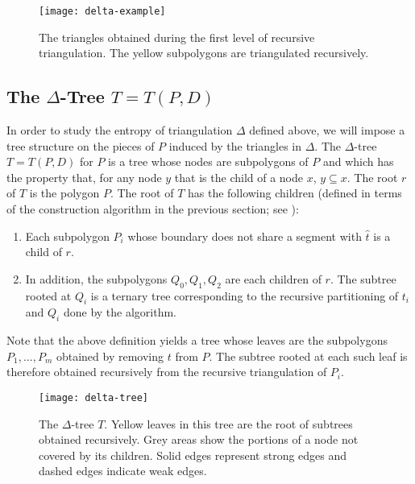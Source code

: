 \documentclass[lotsofwhite]{patmorin}
\newcommand{\z}[1]{{\hat{#1}}}
\begin{document}
\begin{figure}
  \begin{center}
      \texttt{[image: delta-example]}
  \end{center}
  \caption{The triangles obtained during the first level of recursive
triangulation.  The yellow subpolygons are triangulated recursively.}
\end{figure}

\subsection{The $\Delta$-Tree $T=T(P,D)$}

In order to study the entropy of triangulation $\Delta$ defined above,
we will impose a tree structure on the pieces of $P$ induced by the
triangles in $\Delta$.  The $\Delta$-tree $T=T(P,D)$ for $P$ is a tree
whose nodes are subpolygons of $P$ and which has the property that,
for any node $y$ that is the child of a node $x$, $y\subseteq x$. The
root $r$ of $T$ is the polygon $P$.  The root of $T$ has the following
children (defined in terms of the construction algorithm in the
previous section; see ):
\begin{enumerate}
\item Each subpolygon $P_i$ whose boundary does not share a segment
      with $\z t$ is a child of $r$.  
\item In addition, the subpolygons $Q_0,Q_1,Q_2$ are each children
     of $r$.  The subtree rooted at $Q_i$ is a ternary tree corresponding
     to the recursive partitioning of $t_i$ and $Q_i$ done by the algorithm.
\end{enumerate}
Note that the above definition yields a tree whose leaves are the
subpolygons $P_1,\ldots,P_m$  obtained by removing $t$ from $P$.  The
subtree rooted at each such leaf is therefore obtained recursively
from the recursive triangulation of $P_i$.

\begin{figure}
 \begin{center}\texttt{[image: delta-tree]}\end{center}
   \caption{The $\Delta$-tree $T$.  Yellow leaves in this tree are the
     root of subtrees obtained recursively.  Grey areas show the
portions of a node not covered by its children. Solid edges represent strong
edges and dashed edges indicate weak edges.}
\end{figure}
\end{document}
